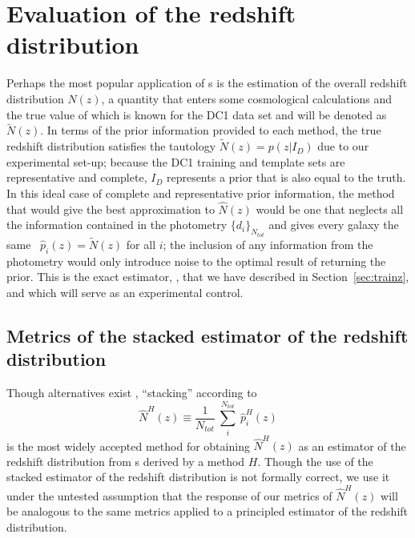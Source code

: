 \appendix

\section{Evaluation of the redshift distribution}
\label{sec:moments}

Perhaps the most popular application of \pzpdf s is the estimation of the overall redshift distribution $N(z)$, a quantity that enters some cosmological calculations and the true value of which is known for the DC1 data set and will be denoted as $\tilde{N}(z)$.
In terms of the prior information provided to each method, the true redshift distribution satisfies the tautology $\tilde{N}(z) = p(z \vert I_{D})$ due to our experimental set-up; because the DC1 training and template sets are representative and complete, $I_{D}$ represents a prior that is also equal to the truth.
In this ideal case of complete and representative prior information, the method that would give the best approximation to $\hat{N}(z)$ would be one that neglects all the information contained in the photometry $\{d_{i}\}_{N_{tot}}$ and gives every galaxy the same \pzpdf\ $\hat{p}_{i}(z) = \tilde{N}(z)$ for all $i$; the inclusion of any information from the photometry would only introduce noise to the optimal result of returning the prior.
This is the exact estimator, \trainz, that we have described in Section~\ref{sec:trainz}, and which will serve as an experimental control.

\subsection{Metrics of the stacked estimator of the redshift distribution}
\label{sec:stackedmetrics}

Though alternatives exist \citep{Malz:chippr}, ``stacking'' according to
\begin{equation}
  \label{eq:stacked}
  \hat{N}^{H}(z) \equiv \frac{1}{N_{tot}}\ \sum_{i}^{N_{tot}}\ \hat{p}^{H}_{i}(z)
\end{equation}
is the most widely accepted method for obtaining $\hat{N}^{H}(z)$ as an estimator of the redshift distribution from \pzpdf s derived by a method $H$.
Though the use of the stacked estimator of the redshift distribution is not formally correct, we use it under the untested assumption that the response of our metrics of $\hat{N}^{H}(z)$ will be analogous to the same metrics applied to a principled estimator of the redshift distribution.

